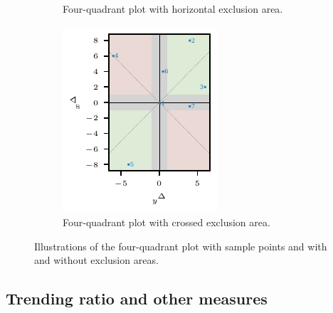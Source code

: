 \begin{figure}
\begin{subfigure}[t]{.24\textwidth}
\caption{Four-quadrant plot with horizontal exclusion area.} \label{fig:trending_basic_4q_excl_axis}
\end{subfigure}\hspace{0.01\textwidth}%
\begin{subfigure}[t]{.24\textwidth}
\includegraphics{plots/illustrative_examples/4q_excl_cross}
\caption{Four-quadrant plot with crossed exclusion area.}\label{fig:trending_basic_4q_excl_cross}
\end{subfigure}%
\caption{Illustrations of the four-quadrant plot with sample points and with and without exclusion areas. }
\label{fig:trending_4q}
\end{figure}

\subsection{Trending ratio and other measures}\label{subsec:trending-measures}

